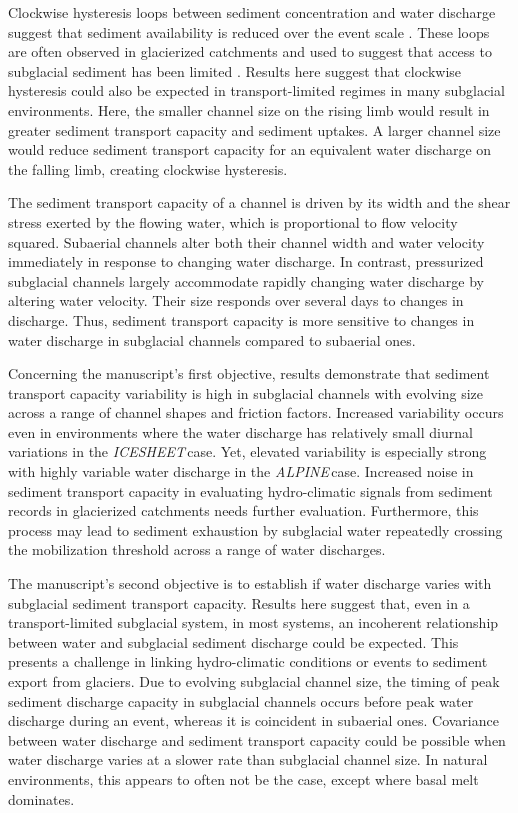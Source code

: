\documentclass[esurf, manuscript]{copernicus}
\newcommand{\alpine}{\textit{ALPINE}\,}
\newcommand{\icesheet}{\textit{ICESHEET}\,}
\begin{document}
Clockwise hysteresis loops between sediment concentration and water discharge suggest that sediment availability is reduced over the event scale \citep[][]{williams1989}.
These loops are often observed in glacierized catchments and used to suggest that access to subglacial sediment has been limited \citep[e.g.][]{collins1979,willis1996,richards2003,stott2007,delaney2018}.
Results here suggest that clockwise hysteresis could also be expected in transport-limited regimes in many subglacial environments.
Here, the smaller channel size on the rising limb would result in greater sediment transport capacity and sediment uptakes.
A larger channel size would reduce sediment transport capacity for an equivalent water discharge on the falling limb, creating clockwise hysteresis. 

\conclusions

The sediment transport capacity of a channel is driven by its width and the shear stress exerted by the flowing water, which is proportional to flow velocity squared.
Subaerial channels alter both their channel width and water velocity immediately in response to changing water discharge.
In contrast, pressurized subglacial channels largely accommodate rapidly changing water discharge by altering water velocity.
Their size responds over several days to changes in discharge.
Thus, sediment transport capacity is more sensitive to changes in water discharge in subglacial channels compared to subaerial ones.

Concerning the manuscript's first objective,
results demonstrate that sediment transport capacity variability is high in subglacial channels with evolving size across a range of channel shapes and friction factors.
Increased variability occurs even in environments where the water discharge has relatively small diurnal variations in the \icesheet case.
Yet, elevated variability is especially strong with highly variable water discharge in the \alpine case.
Increased noise in sediment transport capacity in evaluating hydro-climatic signals from sediment records in glacierized catchments needs further evaluation.
Furthermore, this process may lead to sediment exhaustion by subglacial water repeatedly crossing the mobilization threshold across a range of water discharges. 

The manuscript's second objective is to establish if water discharge varies with subglacial sediment transport capacity.
Results here suggest that, even in a transport-limited subglacial system, in most systems, an incoherent relationship between water and subglacial sediment discharge could be expected.
This presents a challenge in linking hydro-climatic conditions or events to sediment export from glaciers.
Due to evolving subglacial channel size, the timing of peak sediment discharge capacity in subglacial channels occurs before peak water discharge during an event, whereas it is coincident in subaerial ones.
Covariance between water discharge and sediment transport capacity could be possible when water discharge varies at a slower rate than subglacial channel size.
In natural environments, this appears to often not be the case, except where basal melt dominates.
\end{document}
